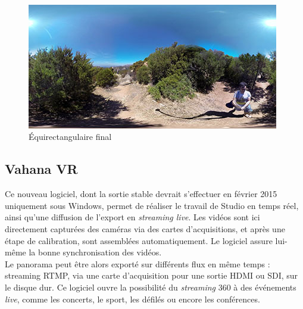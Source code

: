 \begin{figure}
  \centering
  \includegraphics[width=11cm]{images/studio-equirectangular.jpg}
  \caption{Équirectangulaire final} 
\end{figure}

\subsection{Vahana VR}
\label{vahana-vr-section}
Ce nouveau logiciel, dont la sortie stable devrait s'effectuer en février 2015 uniquement sous Windows,
permet de réaliser le travail de Studio en temps réel, ainsi qu'une diffusion
de l'export en \textit{streaming live}. Les vidéos sont ici directement capturées des
caméras via des cartes d'acquisitions, et après une étape de calibration, sont
assemblées automatiquement. Le logiciel assure lui-même la bonne synchronisation
des vidéos.\\
Le panorama peut être alors exporté sur différents flux en même temps : 
streaming RTMP, via une carte d'acquisition pour une sortie HDMI ou SDI, sur le
disque dur. Ce logiciel ouvre la possibilité du \textit{streaming} 360 à des événements 
\textit{live}, comme les concerts, le sport, les défilés ou encore les conférences.
